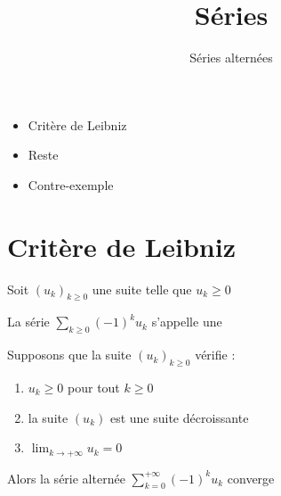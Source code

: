 

   





\title{{\bf Séries}}
\subtitle{Séries alternées}

\begin{frame}
  
  \debutmontitre

  \pause

{\footnotesize
\hfill
{}
\begin{minipage}{0.6\textwidth}
  \begin{itemize}
    \item<3-> Critère de Leibniz
    \item<4-> Reste
    \item<5-> Contre-exemple
  \end{itemize}
\end{minipage}
}

\end{frame}

\setcounter{framenumber}{0}



\section{Critère de Leibniz}

\begin{frame}

Soit $(u_k)_{k\ge0}$ une suite telle que $u_k \ge 0$

\pause
La série $\displaystyle\sum_{k \ge 0} (-1)^k u_k$ s'appelle une 

\pause
\begin{theoreme}
\pause
Supposons que la suite $(u_k)_{k\ge0}$ vérifie :
\begin{enumerate}
  \item\pause $u_k  \ge 0$ pour tout $k \ge 0$
  \item\pause la suite $(u_k)$ est une suite décroissante
  \item\pause $\displaystyle\lim_{k\to+\infty} u_k=0$
\end{enumerate}
\pause
Alors la série alternée $\displaystyle \sum_{k=0}^{+\infty} (-1)^k u_k$ converge
\end{theoreme}

\end{frame}


